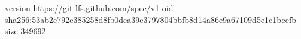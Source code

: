 version https://git-lfs.github.com/spec/v1
oid sha256:53ab2e792e385258d8fb0dea39e3797804bbfb8d14a86e9a67109d5e1c1beefb
size 349692

